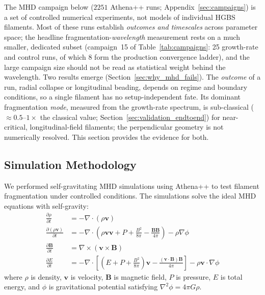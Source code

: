 \documentclass[usenatbib,twoside,twocolumn]{mnras}
\begin{document}
The MHD campaign below ($2251$ Athena++ runs; Appendix~\ref{sec:campaigns}) is a set of controlled numerical experiments, not models of individual HGBS filaments. Most of these runs establish \emph{outcomes and timescales} across parameter space; the headline fragmentation-\emph{wavelength} measurement rests on a much smaller, dedicated subset (campaign~15 of Table~\ref{tab:campaigns}: 25 growth-rate and control runs, of which 8 form the production convergence ladder), and the large campaign size should not be read as statistical weight behind the wavelength. Two results emerge (Section~\ref{sec:why_mhd_fails}). The \emph{outcome} of a run, radial collapse or longitudinal beading, depends on regime and boundary conditions, so a single filament has no setup-independent fate. Its dominant fragmentation \emph{mode}, measured from the growth-rate spectrum, is sub-classical ($\approx0.5$--$1\times$ the classical value; Section~\ref{sec:validation_endtoend}) for near-critical, longitudinal-field filaments; the perpendicular geometry is not numerically resolved. This section provides the evidence for both.

\subsection{Simulation Methodology}

We performed self-gravitating MHD simulations using Athena++ \citep{Stone2020} to test filament fragmentation under controlled conditions. The simulations solve the ideal MHD equations with self-gravity:
\begin{align}
\frac{\partial \rho}{\partial t} &= -\nabla \cdot (\rho \mathbf{v}) \\
\frac{\partial (\rho \mathbf{v})}{\partial t} &= -\nabla \cdot \left(\rho \mathbf{v} \mathbf{v} + P + \frac{B^2}{8\pi} - \frac{\mathbf{B}\mathbf{B}}{4\pi}\right) - \rho \nabla \phi \\
\frac{\partial \mathbf{B}}{\partial t} &= \nabla \times (\mathbf{v} \times \mathbf{B}) \\
\frac{\partial E}{\partial t} &= -\nabla \cdot \left[(E + P + \frac{B^2}{8\pi})\mathbf{v} - \frac{(\mathbf{v} \cdot \mathbf{B})\mathbf{B}}{4\pi}\right] - \rho \mathbf{v} \cdot \nabla \phi
\end{align}
where $\rho$ is density, $\mathbf{v}$ is velocity, $\mathbf{B}$ is magnetic field, $P$ is pressure, $E$ is total energy, and $\phi$ is gravitational potential satisfying $\nabla^2 \phi = 4\pi G\rho$.
\end{document}
